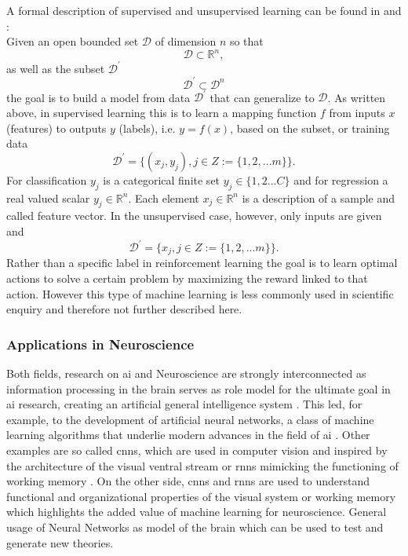 A formal description of supervised and unsupervised learning can be found in \cite{Brunton_kutz_2019} and \cite{Murphy2012}:\\
Given an open bounded set \(\mathcal{D}\) of dimension \(n\) so that
\begin{equation}
\mathcal{D}\subset\mathbb{R}^{n},
\end{equation}
as well as the subset \(\mathcal{D}^{'}\) 
\begin{equation}
    \mathcal{D}^{'}\subset\mathcal{D}^{n}
\end{equation}
the goal is to build a model from data \(\mathcal{D}^{'}\) that can generalize to \(\mathcal{D}\). As written above, in supervised learning this is to learn a mapping function \(f\) from inputs \(x\) (features) to outputs \(y\) (labels), i.e. \(y = f(x)\), based on the subset, or training data
\begin{equation}
    \mathcal{D}^{'}=\{(x_j, y_j), j \in Z := \{1,2,...m\}\}. 
\end{equation}
For classification \(y_j\) is a categorical finite set \(y_j \in \{1,2...C\}\) and for regression a real valued scalar \(y_j \in \mathbb R^{n}\). Each element \(x_j \in \mathbb R^{n}\) is a description of a sample and called feature vector.
In the unsupervised case, however, only inputs are given and 
\begin{equation}
    \mathcal{D}^{'}=\{x_j, j \in Z := \{1,2,...m\}\}. 
\end{equation}
Rather than a specific label in reinforcement learning the goal is to learn optimal actions to solve a certain problem by maximizing the reward linked to that action. However this type of machine learning is less commonly used in scientific enquiry and therefore not further described here.

\subsubsection{Applications in Neuroscience}
Both fields, research on \gls{ai} and Neuroscience are strongly interconnected as information processing in the brain serves as role model for the ultimate goal in \gls{ai} research, creating an artificial general intelligence system \cite{Macpherson2021}. This led, for example, to the development of artificial neural networks, a class of machine learning algorithms that underlie modern advances in the field of \gls{ai} \cite{Cox2014}. Other examples are so called \glspl{cnn}, which are used in computer vision and inspired by the architecture of the visual ventral stream or \glspl{rnn} mimicking the functioning of working memory \cite{Macpherson2021, Fukushima1982, Yin2020}. On the other side, \glspl{cnn} and \glspl{rnn} are used to understand functional and organizational properties of the visual system \cite{Yamins2014} or working memory \cite{Kim2021} which highlights the added value of machine learning for neuroscience.     
General usage of Neural Networks as model of the brain which can be used to test and generate new theories.  

